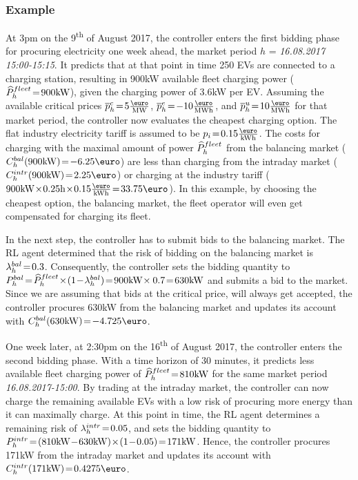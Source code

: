 \documentclass[a4paper, 12pt]{article}
\begin{document}
\subsubsection{Example}
\label{sec:org3e2665a}
At 3pm on the 9\textsuperscript{th} of August 2017, the controller enters the first bidding
phase for procuring electricity one week ahead, the market period \(h\) =
\emph{16.08.2017 15:00-15:15}. It predicts that at that point in time 250 EVs are connected
to a charging station, resulting in 900kW available fleet charging power
(\(\widehat{P}^{fleet}_{h}\!=\!900\text{kW}\)), given the charging power of 3.6kW per EV. Assuming the
available critical prices \(\ccp{h}\!=\!5\emw\), \(\cep{h}\!=\!-10\emwh\), and
\(\cup{h}\!=\!10\emwh\) for that market period, the controller now evaluates the
cheapest charging option. The flat industry electricity tariff is assumed to be
\(p_i\!=\!0.15\ekwh\). The costs for charging with the maximal amount of power
\(\widehat{P}^{fleet}_{h}\) from the balancing market (\(\Cb{h}(900\kw)\!=\!-6.25\eur\)) are less
than charging from the intraday market (\(\Ci{h}(900\kw)\!=\!2.25\eur\)) or
charging at the industry tariff
(\(900\kw\!\times\!0.25\text{h}\!\times\!0.15\ekwh\!=\!33.75\eur\)). In this
example, by choosing the cheapest option, the balancing market, the fleet
operator will even get compensated for charging its fleet.

In the next step, the controller has to submit bids to the balancing market. The
RL agent determined that the risk of bidding on the balancing market is
\(\lambda^{bal}_{h}\!=\!0.3\). Consequently, the controller sets the bidding quantity to
\(\Pb{h}\!=\!\fPhat{h}\!\times\!(1\!-\!\lb{h})\!=\!900\kw\!\times0.7\!=\!630\kw\) and
submits a bid to the market. Since we are assuming that bids at the critical
price, will always get accepted, the controller procures 630kW from the
balancing market and updates its account with \(\Cb{h}(630\kw)\!=\!-4.725\eur\).

One week later, at 2:30pm on the 16\textsuperscript{th} of August 2017, the controller enters
the second bidding phase. With a time horizon of 30 minutes, it predicts less
available fleet charging power of \(\widehat{P}^{fleet}_{h}\!=\!810\text{kW}\) for the same market
period \emph{16.08.2017-15:00}. By trading at the intraday market, the controller can
now charge the remaining available EVs with a low risk of procuring more energy
than it can maximally charge. At this point in time, the RL agent determines a
remaining risk of \(\lambda^{intr}_{h}\!=\!0.05\), and sets the bidding quantity to
\(\Pi{h}\!=\!(810\kw\!-\!630\kw)\!\times\!(1\!-\!0.05)\!=\!171\kw\). Hence, the
controller procures 171kW from the intraday market and updates its account with
\(\Ci{h}(171\kw)\!=\!0.4275\eur\).
\end{document}

